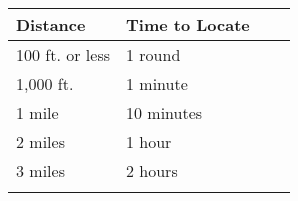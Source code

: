 \begin{longtable}{llll}
\hline
\multicolumn{1}{|p{0.906in}|}{\begin{minipage}[t]{0.906in}\raggedright
\textbf{Distance}\end{minipage}} & \multicolumn{1}{p{1.045in}|}{\begin{minipage}[t]{1.045in}\raggedright
\textbf{Time to Locate}\end{minipage}}\\
\hline
\multicolumn{1}{p{0.069in}|}{\begin{minipage}[t]{0.069in}\raggedright
100 ft. or less\end{minipage}} & \multicolumn{1}{p{0.069in}|}{\begin{minipage}[t]{0.069in}\raggedright
1 round\end{minipage}}\\
\hline
\multicolumn{1}{|p{0.906in}|}{\begin{minipage}[t]{0.906in}\raggedright
1,000 ft.\end{minipage}} & \multicolumn{1}{p{1.045in}|}{\begin{minipage}[t]{1.045in}\raggedright
1 minute\end{minipage}}\\
\hline
\multicolumn{1}{p{0.069in}|}{\begin{minipage}[t]{0.069in}\raggedright
1 mile\end{minipage}} & \multicolumn{1}{p{0.069in}|}{\begin{minipage}[t]{0.069in}\raggedright
10 minutes\end{minipage}}\\
\hline
\multicolumn{1}{|p{0.906in}|}{\begin{minipage}[t]{0.906in}\raggedright
2 miles\end{minipage}} & \multicolumn{3}{p{1.184in}|}{\begin{minipage}[t]{1.184in}\raggedright
1 hour\end{minipage}}\\
\hline
\multicolumn{1}{p{0.069in}|}{\begin{minipage}[t]{0.069in}\raggedright
3 miles\end{minipage}} & \multicolumn{1}{p{0.069in}|}{\begin{minipage}[t]{0.069in}\raggedright
2 hours\end{minipage}}\\
\hline
\multicolumn{1}{|p{0.906in}|}{\begin{minipage}[t]{0.906in}\raggedright

\end{minipage}}
\end{longtable}
